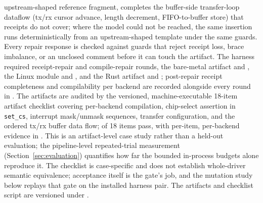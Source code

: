 upstream-shaped reference fragment, completes the buffer-side transfer-loop
dataflow (tx/rx cursor advance, length decrement, FIFO-to-buffer store)
that receipts do not cover; where the model could not be reached, the same
insertion runs deterministically from an upstream-shaped template under the
same guards. Every repair response is checked against guards
that reject receipt loss, brace imbalance, or an unclosed comment before it
can touch the artifact. The
harness required \DwHarnLoweringRounds{} receipt-repair and
\DwHarnRepairRounds{} compile-repair rounds, the bare-metal artifact
\DwBareLoweringRounds{} and \DwBareRepairRounds{}, the Linux module
\DwLinuxLoweringRounds{} and \DwLinuxRepairRounds{}, and the Rust artifact
\DwRustLoweringRounds{} and \DwRustRepairRounds{}; post-repair receipt
completeness and compilability per backend are recorded alongside every
round in . The
artifacts are audited by the versioned, machine-executable 18-item artifact
checklist covering per-backend compilation, chip-select assertion in
\texttt{set\_cs}, interrupt mask/unmask sequences, transfer configuration,
and the ordered tx/rx buffer data flow; \DWChecklistPassed{} of 18 items
pass, with per-item, per-backend evidence in
. This is an
artifact-level case study rather than a held-out evaluation; the
pipeline-level repeated-trial measurement (Section~\ref{sec:evaluation})
quantifies how far the bounded in-process budgets alone reproduce it. The
checklist is case-specific and does not establish
whole-driver semantic equivalence; acceptance itself is the gate's job, and
the mutation study below replays that gate on the installed harness pair.
The artifacts and checklist script are versioned under
.

